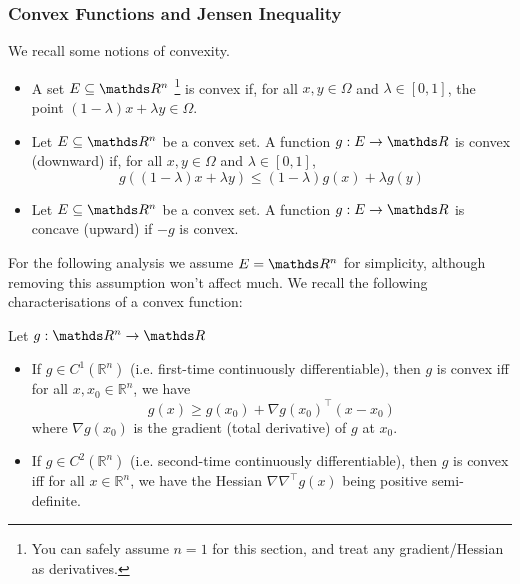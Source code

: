 \subsubsection{Convex Functions and Jensen Inequality}
We recall some notions of convexity.
\begin{definition}[Convexity] \phantom{blah\\}
\begin{itemize}
    \item A set $E \subseteq \R^n$ \footnote{You can safely assume $n = 1$ for this section, and treat any gradient/Hessian as derivatives.} is convex if, for all $x,y \in \Omega$ and $\lambda \in [0,1]$, the point $(1-\lambda) x + \lambda y \in \Omega$.
    \item Let $E \subseteq \R^n$ be a convex set. A function $g:E \to \R$ is convex (downward) if, for all $x,y \in \Omega$ and $\lambda \in [0,1]$, 
    \begin{equation}
        g((1-\lambda) x + \lambda y) \leq (1-\lambda) g(x) + \lambda g(y)
    \end{equation}
    \item Let $E \subseteq \R^n$ be a convex set. A function $g:E\to \R$ is concave (upward) if $-g$ is convex.
\end{itemize}
\end{definition}

For the following analysis we assume $E = \R^n$ for simplicity, although removing this assumption won't affect much. We recall the following characterisations of a convex function:

\begin{proposition} Let $g:\R^n \to \R$
\begin{itemize}
    \item If $g \in C^1(\mathbb{R}^n)$ (i.e. first-time continuously differentiable), then $g$ is convex iff for all $x, x_0 \in \mathbb{R}^n$, we have
    \begin{equation}
        g(x) \geq g(x_0) + \nabla g(x_0)^\top (x - x_0) 
    \end{equation}
    where $\nabla g(x_0)$ is the gradient (total derivative) of $g$ at $x_0$.
    \item If $g \in C^2(\mathbb{R}^n)$ (i.e. second-time continuously differentiable), then $g$ is convex iff for all $x \in \mathbb{R}^n$, we have the Hessian $\nabla \nabla^\top g(x)$ being positive semi-definite.
\end{itemize}
\end{proposition}

